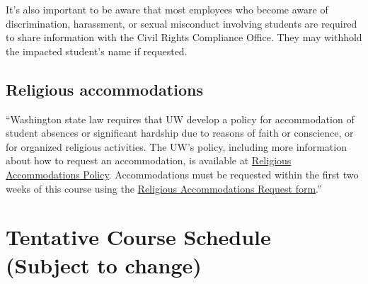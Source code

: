 \documentclass[12pt, letterpaper]{article}
\begin{document}
It’s also important to be aware that most employees who become aware of discrimination, harassment, or sexual misconduct involving students are required to share information with the Civil Rights Compliance Office. They may withhold the impacted student’s name if requested.

\subsection*{Religious accommodations}	\label{sec:religious}

“Washington state law requires that UW develop a policy for accommodation of student absences or significant hardship due to reasons of faith or conscience, or for organized religious activities. The UW’s policy, including more information about how to request an accommodation, is available at \href{https://registrar.washington.edu/staff-faculty/religious-accommodations-policy/}{Religious Accommodations Policy}. Accommodations must be requested within the first two weeks of this course using the \href{https://registrar.washington.edu/students/religious-accommodations-request/}{Religious Accommodations Request form}.”

\newpage

\section*{Tentative Course Schedule (Subject to change)} \label{sec:schedule}
\end{document}
